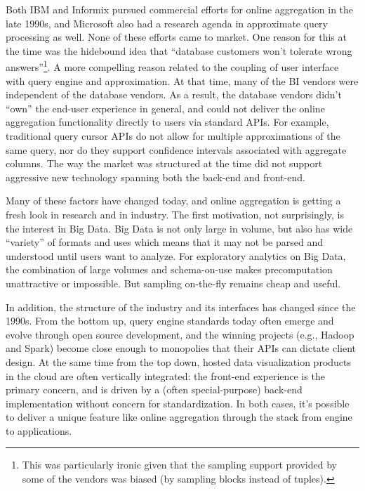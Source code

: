 \documentclass[b5paper,11pt,twoside,openright]{book}
\begin{document}
Both IBM and Informix pursued commercial efforts for online aggregation
in the late 1990s, and Microsoft also had a research agenda in
approximate query processing as well. None of these efforts came to
market. One reason for this at the time was the hidebound idea that
``database customers won't tolerate wrong
answers''\footnote{This was particularly ironic given that the sampling support provided
  by some of the vendors was biased (by sampling blocks instead of
  tuples).}. A more compelling
reason related to the coupling of user interface with query engine and
approximation. At that time, many of the BI vendors were independent of
the database vendors. As a result, the database vendors didn't ``own''
the end-user experience in general, and could not deliver the online
aggregation functionality directly to users via standard APIs. For
example, traditional query cursor APIs do not allow for multiple
approximations of the same query, nor do they support confidence
intervals associated with aggregate columns. The way the market was
structured at the time did not support aggressive new technology
spanning both the back-end and front-end.

Many of these factors have changed today, and online aggregation is
getting a fresh look in research and in industry. The first motivation,
not surprisingly, is the interest in Big Data. Big Data is not only
large in volume, but also has wide ``variety'' of formats and uses which
means that it may not be parsed and understood until users want to
analyze. For exploratory analytics on Big Data, the combination of large
volumes and schema-on-use makes precomputation unattractive or
impossible. But sampling on-the-fly remains cheap and useful.

In addition, the structure of the industry and its interfaces has
changed since the 1990s. From the bottom up, query engine standards
today often emerge and evolve through open source development, and the
winning projects (e.g., Hadoop and Spark) become close enough to
monopolies that their APIs can dictate client design. At the same time
from the top down, hosted data visualization products in the cloud are
often vertically integrated: the front-end experience is the primary
concern, and is driven by a (often special-purpose) back-end
implementation without concern for standardization. In both cases, it's
possible to deliver a unique feature like online aggregation through the
stack from engine to applications.
\end{document}
